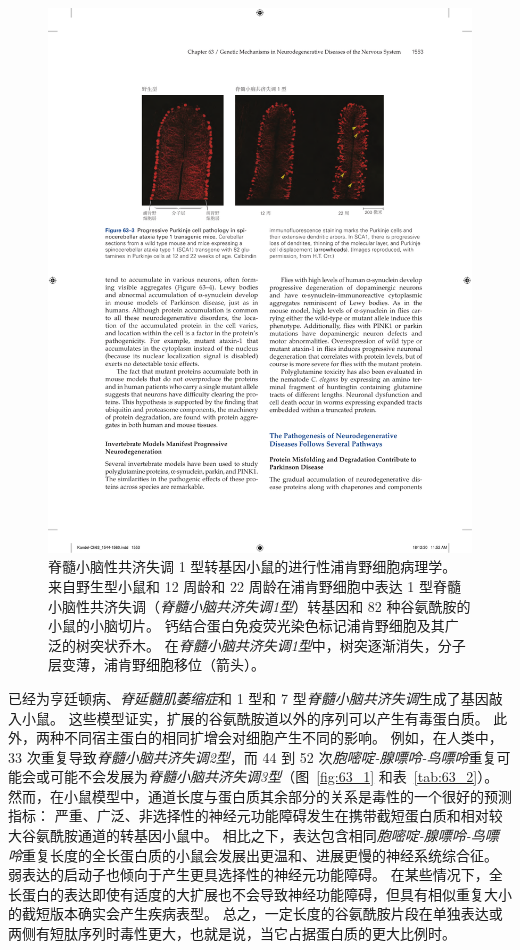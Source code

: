 \begin{figure}[htbp]
	\centering
	\includegraphics[width=0.95\linewidth]{chap63/fig_63_3}
	\caption{脊髓小脑性共济失调 1 型转基因小鼠的进行性浦肯野细胞病理学。
		来自野生型小鼠和 12 周龄和 22 周龄在浦肯野细胞中表达 1 型脊髓小脑性共济失调（\textit{脊髓小脑共济失调1型}）转基因和 82 种谷氨酰胺的小鼠的小脑切片。
		钙结合蛋白免疫荧光染色标记浦肯野细胞及其广泛的树突状乔木。
		在\textit{脊髓小脑共济失调1型}中，树突逐渐消失，分子层变薄，浦肯野细胞移位（箭头）。}
	\label{fig:63_3}
\end{figure}


已经为亨廷顿病、\textit{脊延髓肌萎缩症}和 1 型和 7 型\textit{脊髓小脑共济失调}生成了基因敲入小鼠。
这些模型证实，扩展的谷氨酰胺道以外的序列可以产生有毒蛋白质。
此外，两种不同宿主蛋白的相同扩增会对细胞产生不同的影响。
例如，在人类中，33 次重复导致\textit{脊髓小脑共济失调2型}，而 44 到 52 次\textit{胞嘧啶-腺嘌呤-鸟嘌呤}重复可能会或可能不会发展为\textit{脊髓小脑共济失调3型}（图~\ref{fig:63_1} 和表~\ref{tab:63_2}）。
然而，在小鼠模型中，通道长度与蛋白质其余部分的关系是毒性的一个很好的预测指标：
严重、广泛、非选择性的神经元功能障碍发生在携带截短蛋白质和相对较大谷氨酰胺通道的转基因小鼠中。
相比之下，表达包含相同\textit{胞嘧啶-腺嘌呤-鸟嘌呤}重复长度的全长蛋白质的小鼠会发展出更温和、进展更慢的神经系统综合征。
弱表达的启动子也倾向于产生更具选择性的神经元功能障碍。
在某些情况下，全长蛋白的表达即使有适度的大扩展也不会导致神经功能障碍，但具有相似重复大小的截短版本确实会产生疾病表型。
总之，一定长度的谷氨酰胺片段在单独表达或两侧有短肽序列时毒性更大，也就是说，当它占据蛋白质的更大比例时。


